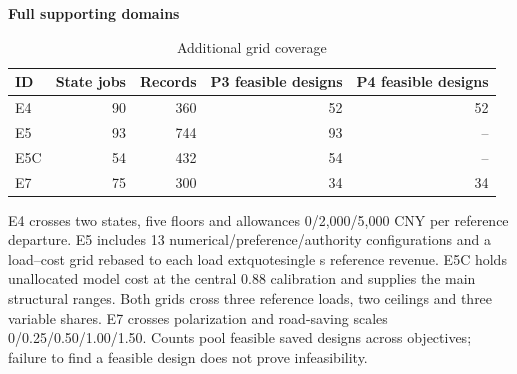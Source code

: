 \begin{table}[htbp]\centering
\caption{Additional grid coverage}\label{tab:review_appendix_design}
\begin{minipage}{.95\textwidth}\fontsize{8}{10}\selectfont{}\setlength{\tabcolsep}{2pt}\renewcommand{\arraystretch}{1.08}
\par\noindent\textbf{Full supporting domains}\par\smallskip
\begin{tabular*}{\linewidth}{@{\extracolsep{\fill}}lrrrr@{}}\toprule
ID & State jobs & Records & P3 feasible designs & P4 feasible designs \\
\midrule
E4 & 90 & 360 & 52 & 52 \\
E5 & 93 & 744 & 93 & -- \\
E5C & 54 & 432 & 54 & -- \\
E7 & 75 & 300 & 34 & 34 \\
\bottomrule\end{tabular*}\par\medskip
\par\noindent\fontsize{8}{9.5}\selectfont E4 crosses two states, five floors and allowances 0/2,000/5,000 CNY per reference departure. E5 includes 13 numerical/preference/authority configurations and a load--cost grid rebased to each load	extquotesingle s reference revenue. E5C holds unallocated model cost at the central 0.88 calibration and supplies the main structural ranges. Both grids cross three reference loads, two ceilings and three variable shares. E7 crosses polarization and road-saving scales 0/0.25/0.50/1.00/1.50. Counts pool feasible saved designs across objectives; failure to find a feasible design does not prove infeasibility.
\end{minipage}\end{table}
